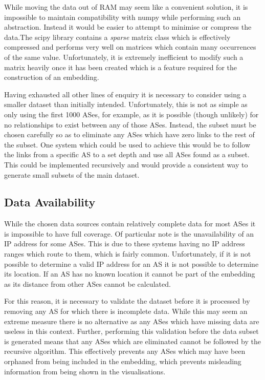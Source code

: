 While moving the data out of RAM may seem like a convenient solution, it is impossible to maintain compatibility with numpy while performing such an abstraction. Instead it would be easier to attempt to minimise or compress the data.The scipy library contains a \textit{sparse} matrix class which is effectively compressed and performs very well on matrices which contain many occurrences of the same value. Unfortunately, it is extremely inefficient to modify such a matrix heavily once it has been created which is a feature required for the construction of an embedding. 

Having exhausted all other lines of enquiry it is necessary to consider using a smaller dataset than initially intended. Unfortunately, this is not as simple as only using the first 1000 ASes, for example, as it is possible (though unlikely) for no relationships to exist between any of those ASes. Instead, the subset must be chosen carefully so as to eliminate any ASes which have zero links to the rest of the subset. One system which could be used to achieve this would be to follow the links from a specific AS to a set depth and use all ASes found as a subset. This could be implemented recursively and would provide a consistent way to generate small subsets of the main dataset.

\subsection{Data Availability}
While the chosen data sources contain relatively complete data for most ASes it is impossible to have full coverage. Of particular note is the unavailability of an IP address for some ASes. This is due to these systems having no IP address ranges which route to them, which is fairly common. Unfortunately, if it is not possible to determine a valid IP address for an AS it is not possible to determine its location. If an AS has no known location it cannot be part of the embedding as its distance from other ASes cannot be calculated. 

For this reason, it is necessary to validate the dataset before it is processed by removing any AS for which there is incomplete data. While this may seem an extreme measure there is no alternative as any ASes which have missing data are useless in this context. Further, performing this validation before the data subset is generated means that any ASes which are eliminated cannot be followed by the recursive algorithm. This effectively prevents any ASes which may have been orphaned from being included in the embedding, which prevents misleading information from being shown in the visualisations. 